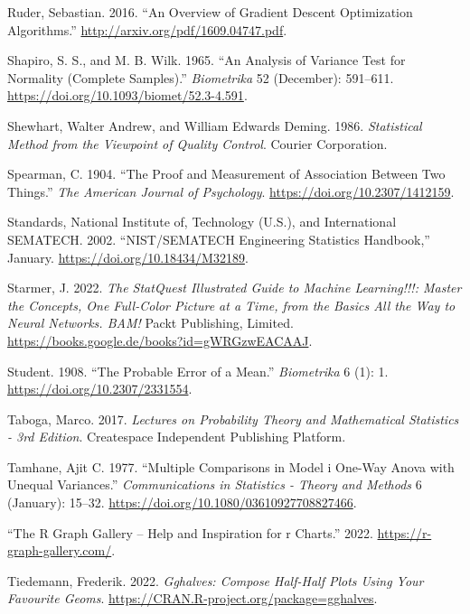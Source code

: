\documentclass[
  a4paper,
]{scrbook}
\newlength{\cslhangindent}
\newenvironment{CSLReferences}[2] %
 {\begin{list}{}{%
  \setlength{\itemindent}{0pt}
  \setlength{\leftmargin}{0pt}
  \setlength{\parsep}{0pt}
  \ifodd #1
   \setlength{\leftmargin}{\cslhangindent}
   \setlength{\itemindent}{-1\cslhangindent}
  \fi
  \setlength{\itemsep}{#2\baselineskip}}}
 {\end{list}}
\begin{document}
\begin{CSLReferences}{1}{0}
Ruder, Sebastian. 2016. {``An Overview of Gradient Descent Optimization
Algorithms.''} \url{http://arxiv.org/pdf/1609.04747.pdf}.

Shapiro, S. S., and M. B. Wilk. 1965. {``An Analysis of Variance Test
for Normality (Complete Samples).''} \emph{Biometrika} 52 (December):
591--611. \url{https://doi.org/10.1093/biomet/52.3-4.591}.

Shewhart, Walter Andrew, and William Edwards Deming. 1986.
\emph{Statistical Method from the Viewpoint of Quality Control}. Courier
Corporation.

Spearman, C. 1904. {``The Proof and Measurement of Association Between
Two Things.''} \emph{The American Journal of Psychology}.
\url{https://doi.org/10.2307/1412159}.

Standards, National Institute of, Technology (U.S.), and International
SEMATECH. 2002. {``NIST/SEMATECH Engineering Statistics Handbook,''}
January. \url{https://doi.org/10.18434/M32189}.

Starmer, J. 2022. \emph{The StatQuest Illustrated Guide to Machine
Learning!!!: Master the Concepts, One Full-Color Picture at a Time, from
the Basics All the Way to Neural Networks. BAM!} Packt Publishing,
Limited. \url{https://books.google.de/books?id=gWRGzwEACAAJ}.

Student. 1908. {``The Probable Error of a Mean.''} \emph{Biometrika} 6
(1): 1. \url{https://doi.org/10.2307/2331554}.

Taboga, Marco. 2017. \emph{Lectures on Probability Theory and
Mathematical Statistics - 3rd Edition}. Createspace Independent
Publishing Platform.

Tamhane, Ajit C. 1977. {``Multiple Comparisons in Model i One-Way Anova
with Unequal Variances.''} \emph{Communications in Statistics - Theory
and Methods} 6 (January): 15--32.
\url{https://doi.org/10.1080/03610927708827466}.

{``The {R} Graph Gallery -- Help and Inspiration for r Charts.''} 2022.
\url{https://r-graph-gallery.com/}.

Tiedemann, Frederik. 2022. \emph{Gghalves: Compose Half-Half Plots Using
Your Favourite Geoms}.
\url{https://CRAN.R-project.org/package=gghalves}.


\end{CSLReferences}
\end{document}

